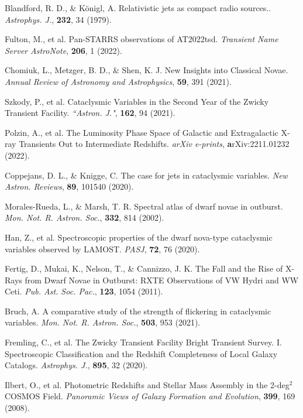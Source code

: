 \documentclass{nature_plusfigure}
\newcommand{\mn}{{Mon. Not. R. Astron. Soc.}}
\newcommand{\nar}{{New Astron. Reviews}}
\newcommand{\mnras}{\mn}
\newcommand{\aj}{{``Astron. J."}}
\newcommand{\apj}{{Astrophys. J.}}
\newcommand{\pasj}{{PASJ}}
\newcommand{\pasp}{{Pub. Ast. Soc. Pac.}}
\newcommand{\araa}{Annual Review of Astronomy and Astrophysics}
\begin{document}
\begin{methods}
\begin{thebibliography}{10}
  Blandford, R. D., \& Königl, A. Relativistic jets as compact radio sources.. \emph{\apj}, \textbf{232}, 34 (1979). 


 Fulton, M., et al. Pan-STARRS observations of AT2022tsd. \emph{Transient Name Server AstroNote}, \textbf{206}, 1 (2022). 

 Chomiuk, L., Metzger, B. D., \& Shen, K. J. New Insights into Classical Novae. \emph{\araa}, \textbf{59}, 391 (2021). 

 Szkody, P., et al. Cataclysmic Variables in the Second Year of the Zwicky Transient Facility. \emph{\aj}, \textbf{162}, 94 (2021). 

 Polzin, A., et al. The Luminosity Phase Space of Galactic and Extragalactic X-ray Transients Out to Intermediate Redshifts. \emph{arXiv e-prints}, \textbf arXiv:2211.01232 (2022). 

 Coppejans, D. L., \& Knigge, C. The case for jets in cataclysmic variables. \emph{\nar}, \textbf{89}, 101540 (2020). 

 Morales-Rueda, L., \& Marsh, T. R. Spectral atlas of dwarf novae in outburst. \emph{\mnras}, \textbf{332}, 814 (2002). 

 Han, Z., et al. Spectroscopic properties of the dwarf nova-type cataclysmic variables observed by LAMOST. \emph{\pasj}, \textbf{72}, 76 (2020). 

 Fertig, D., Mukai, K., Nelson, T., \& Cannizzo, J. K. The Fall and the Rise of X-Rays from Dwarf Novae in Outburst: RXTE Observations of VW Hydri and WW Ceti. \emph{\pasp}, \textbf{123}, 1054 (2011). 

 Bruch, A. A comparative study of the strength of flickering in cataclysmic variables. \emph{\mnras}, \textbf{503}, 953 (2021). 

 Fremling, C., et al. The Zwicky Transient Facility Bright Transient Survey. I. Spectroscopic Classification and the Redshift Completeness of Local Galaxy Catalogs. \emph{\apj}, \textbf{895}, 32 (2020).

 Ilbert, O., et al. Photometric Redshifts and Stellar Mass Assembly in the 2-deg$^2$ COSMOS Field. \emph{Panoramic Views of Galaxy Formation and Evolution}, \textbf{399}, 169 (2008). 


\end{thebibliography}
\end{methods}
\end{document}
